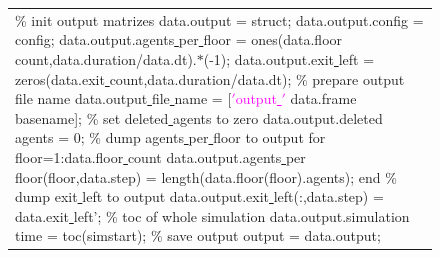 \documentclass[11pt]{article}
\begin{document}
\begin{figure}[H]
\centering
\begin{tabular}
{|>{\large}m{\textwidth}|} \hline
\bigskip
\textcolor{commentcolor}{\% init output matrizes}
\newline
data.output = struct;
\newline
data.output.config = config;
\newline
data.output.agents\underline{ }per\underline{ }floor = ones(data.floor\underline{ }count,data.duration/data.dt).$*$(-1);
\newline
data.output.exit\underline{ }left = zeros(data.exit\underline{ }count,data.duration/data.dt);
\newline
\newline
\textcolor{commentcolor}{\% prepare output file name}
\newline
data.output\underline{ }file\underline{ }name = [\textcolor{magenta}{$'$output\underline{ }$'$} data.frame\underline{ }basename];
\newline
\newline
\textcolor{commentcolor}{\% set deleted\underline{ }agents to zero}
\newline
data.output.deleted\underline{ }agents = 0;
\newline
\newline
\textcolor{commentcolor}{\% dump agents\underline{ }per\underline{ }floor to output }
\newline
\textcolor{keywordcolor}{for} floor=1:data.floor\underline{ }count
\newline
data.output.agents\underline{ }per\underline{ }floor(floor,data.step) = length(data.floor(floor).agents);
\newline
\textcolor{keywordcolor}{end}
\newline
\newline
\textcolor{commentcolor}{\% dump exit\underline{ }left to output}
\newline
data.output.exit\underline{ }left(:,data.step) = data.exit\underline{ }left';
\newline
\newline
\textcolor{commentcolor}{\% toc of whole simulation}
\newline
data.output.simulation\underline{ }time = toc(simstart);
\newline
\newline
\textcolor{commentcolor}{\% save output}
\newline
output = data.output;
\newline

\end{tabular}
\end{figure}
\end{document}
